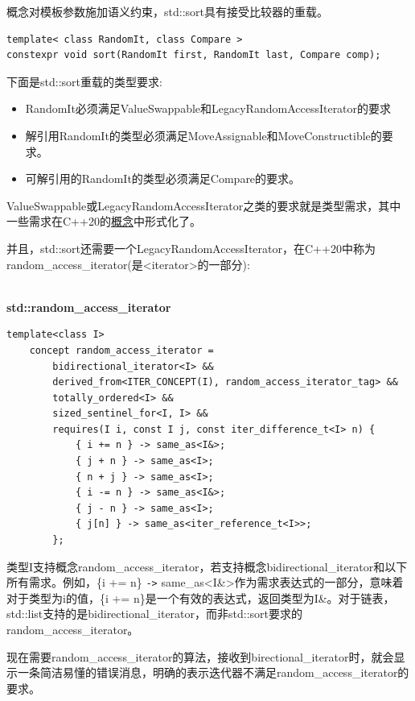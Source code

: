 概念对模板参数施加语义约束，std::sort具有接受比较器的重载。

\begin{lstlisting}[style=styleCXX]
template< class RandomIt, class Compare >
constexpr void sort(RandomIt first, RandomIt last, Compare comp);
\end{lstlisting}

下面是std::sort重载的类型要求:

\begin{itemize}
\item
RandomIt必须满足ValueSwappable和LegacyRandomAccessIterator的要求

\item
解引用RandomIt的类型必须满足MoveAssignable和MoveConstructible的要求。

\item
可解引用的RandomIt的类型必须满足Compare的要求。
\end{itemize}

ValueSwappable或LegacyRandomAccessIterator之类的要求就是类型需求，其中一些需求在C++20的\href{https://en.cppreference.com/w/cpp/language/constraints}{概念}中形式化了。

并且，std::sort还需要一个LegacyRandomAccessIterator，在C++20中称为random\_access\_iterator(是<iterator>的一部分):

\hspace*{\fill} \\ %
\noindent
\textbf{std::random\_access\_iterator}
\begin{lstlisting}[style=styleCXX]
template<class I>
	concept random_access_iterator =
		bidirectional_iterator<I> &&
		derived_from<ITER_CONCEPT(I), random_access_iterator_tag> &&
		totally_ordered<I> &&
		sized_sentinel_for<I, I> &&
		requires(I i, const I j, const iter_difference_t<I> n) {
			{ i += n } -> same_as<I&>;
			{ j + n } -> same_as<I>;
			{ n + j } -> same_as<I>;
			{ i -= n } -> same_as<I&>;
			{ j - n } -> same_as<I>;
			{ j[n] } -> same_as<iter_reference_t<I>>;
		};
\end{lstlisting}

类型I支持概念random\_access\_iterator，若支持概念bidirectional\_iterator和以下所有需求。例如，\{i += n\} \texttt{->} same\_as<I\&>作为需求表达式的一部分，意味着对于类型为i的值，\{i += n\}是一个有效的表达式，返回类型为I\&。对于链表，std::list支持的是bidirectional\_iterator，而非std::sort要求的random\_access\_iterator。

现在需要random\_access\_iterator的算法，接收到birectional\_iterator时，就会显示一条简洁易懂的错误消息，明确的表示迭代器不满足random\_access\_iterator的要求。

